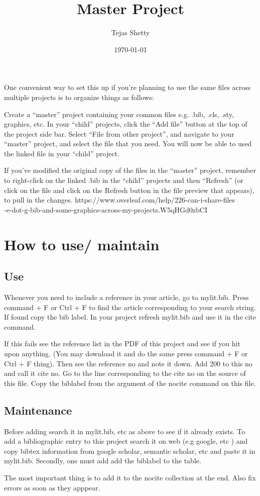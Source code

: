 \documentclass{article}
\begin{document}
\title{Master Project}
\author{Tejas Shetty}
\date{\today} %
\maketitle
One convenient way to set this up if you're planning to use the same files across multiple projects is to organize things as follows:

Create a “master” project containing your common files e.g. .bib, .cls, .sty, graphics, etc.
In your “child” projects, click the “Add file” button at the top of the project side bar.
Select “File from other project”, and navigate to your “master” project, and select the file that you need.
You will now be able to used the linked file in your “child” project.

If you’ve modified the original copy of the files in the “master” project, remember to right-click on the linked .bib in the “child” projects and then “Refresh” (or click on the file and click on the Refresh button in the file preview that appears), to pull in the changes.
\cite{maday2003new}
{https://www.overleaf.com/help/226-can-i-share-files\\
-e-dot-g-bib-and-some-graphics-across-my-projects.W5qHGd0zbCI}\\

\section{How to use/ maintain}
\subsection{Use}
Whenever you need to include a reference in your article, go to mylit.bib. Press command + F or Ctrl + F to find the article corresponding to your search string. If found copy the bib label. In your project refresh mylit.bib and use it in the cite command.    
\par
If this fails see the reference list in the PDF of this project and see if you hit upon anything. (You may download it and do the same press command + F or Ctrl + F thing). Then see the reference no and note it down.  Add 200 to this no and call it cite no. Go to the line corresponding to the cite no on the source of this file. Copy the biblabel from the argument of the nocite command on this file. 
\subsection{Maintenance}
Before adding search it in mylit.bib, etc as above to see if it already exists.
To add a bibliographic entry to this project search it on  web (e.g google, etc ) and copy bibtex information  from  google scholar, semantic scholar, etc and paste it in mylit.bib. Secondly, one must add
add the biblabel to the table. 
\par
The most important thing is to add it to the nocite collection at the end. Also fix errors as soon as they apppear.
\end{document}
